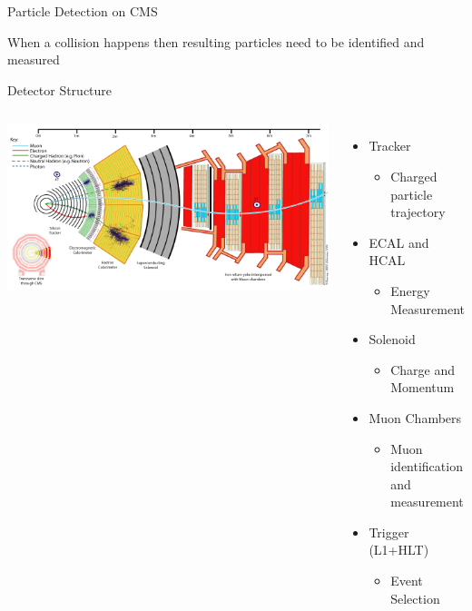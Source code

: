 \documentclass[8pt]{beamer}
\begin{document}
\begin{frame}{Particle Detection on CMS}

When a collision happens then resulting particles need to be identified and measured
 
 \begin{block}{Detector Structure}

  \begin{columns}
    \column[t]{8.0cm}
 
      \begin{center}
        \includegraphics[width=1.00\textwidth]{img/CMS_Slice.png} 
      \end{center}  
      \column[t]{3.5cm}

       \begin{itemize}
         \item Tracker
         \begin{itemize}
           \item Charged particle trajectory
         \end{itemize}
         \item ECAL and HCAL
         \begin{itemize}
           \item Energy Measurement
         \end{itemize}
         \item Solenoid
         \begin{itemize}
           \item Charge and Momentum 
         \end{itemize} 
         \item Muon Chambers
         \begin{itemize}
           \item Muon identification and measurement 
         \end{itemize} 
         \item Trigger (L1+HLT)
         \begin{itemize}
           \item Event Selection 
         \end{itemize} 
       \end{itemize}


\end{columns}
\end{block}
\end{frame}
\end{document}
